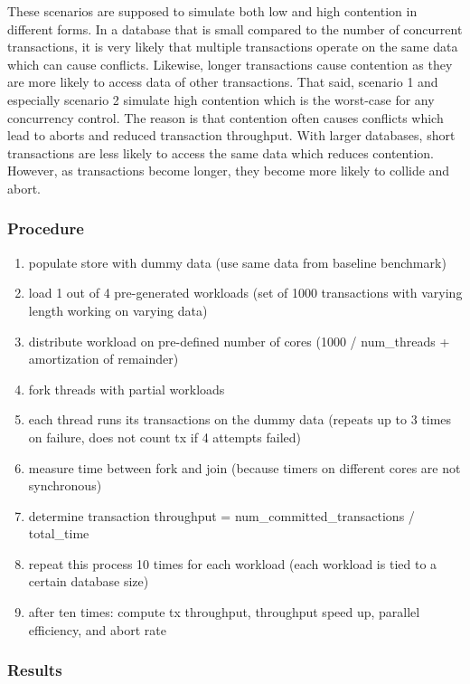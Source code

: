 These scenarios are supposed to simulate both low and high contention in
different forms. In a database that is small compared to the number of
concurrent transactions, it is very likely that multiple transactions operate on
the same data which can cause conflicts. Likewise, longer transactions cause
contention as they are more likely to access data of other transactions. That
said, scenario 1 and especially scenario 2 simulate high contention which is the
worst-case for any concurrency control. The reason is that contention often
causes conflicts which lead to aborts and reduced transaction throughput. With
larger databases, short transactions are less likely to access the same data
which reduces contention. However, as transactions become longer, they become
more likely to collide and abort.

\subsubsection{Procedure}

\begin{enumerate}
    \item populate store with dummy data (use same data from baseline benchmark)
    \item load 1 out of 4 pre-generated workloads (set of 1000 transactions with varying length working on varying data)
    \item distribute workload on pre-defined number of cores (1000 / num\_threads + amortization of remainder)
    \item fork threads with partial workloads
    \item each thread runs its transactions on the dummy data (repeats up to 3 times on failure, does not count tx if 4 attempts failed)
    \item measure time between fork and join (because timers on different cores are not synchronous)
    \item determine transaction throughput = num\_committed\_transactions / total\_time
    \item repeat this process 10 times for each workload (each workload is tied to a certain database size)
    \item after ten times: compute tx throughput, throughput speed up, parallel efficiency, and abort rate
\end{enumerate}

\subsubsection{Results}

